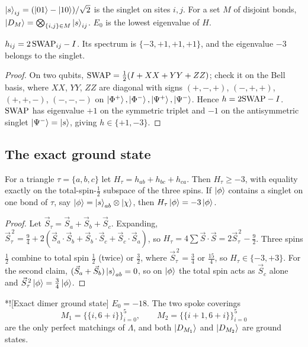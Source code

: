 \begin{ntn}
  $\ket{s}_{ij}=(\ket{01}-\ket{10})/\sqrt2$ is the singlet on sites $i,j$. For a set $M$ of
  disjoint bonds, $\ket{D_M}=\bigotimes_{\{i,j\}\in M}\ket{s}_{ij}$. $E_0$ is the lowest
  eigenvalue of $H$.
\end{ntn}

\begin{lem}\label{lem:bond}
  $h_{ij}=2\,\mathrm{SWAP}_{ij}-I$. Its spectrum is $\{-3,+1,+1,+1\}$, and the eigenvalue $-3$
  belongs to the singlet.
\end{lem}

\begin{proof}
  On two qubits, $\mathrm{SWAP}=\tfrac12(I+XX+YY+ZZ)$; check it on the Bell basis, where $XX$, $YY$, $ZZ$
  are diagonal with signs $(+,-,+)$, $(-,+,+)$, $(+,+,-)$, $(-,-,-)$ on
  $\ket{\Phi^+},\ket{\Phi^-},\ket{\Psi^+},\ket{\Psi^-}$. Hence $h=2\mathrm{SWAP}-I$. $\mathrm{SWAP}$ has
  eigenvalue $+1$ on the symmetric triplet and $-1$ on the antisymmetric singlet
  $\ket{\Psi^-}=\ket s$, giving $h\in\{+1,-3\}$.
\end{proof}

\subsection{The exact ground state}

\begin{lem}\label{lem:triangle}
  For a triangle $\tau=\{a,b,c\}$ let $H_\tau=h_{ab}+h_{bc}+h_{ca}$. Then $H_\tau\geq-3$, with
  equality exactly on the total-spin-$\tfrac12$ subspace of the three spins. If $\ket\phi$
  contains a singlet on one bond of $\tau$, say $\ket\phi=\ket s_{ab}\otimes\ket{\chi}$, then
  $H_\tau\ket\phi=-3\ket\phi$.
\end{lem}

\begin{proof}
  Let $\vec S_\tau=\vec S_a+\vec S_b+\vec S_c$. Expanding,
  $\vec S_\tau^{\,2}=\tfrac94+2(\vec S_a\cdot\vec S_b+\vec S_b\cdot\vec S_c+\vec S_c\cdot\vec S_a)$,
  so $H_\tau=4\sum\vec S\cdot\vec S=2\vec S_\tau^{\,2}-\tfrac92$. Three spins $\tfrac12$
  combine to total spin $\tfrac12$ (twice) or $\tfrac32$, where $\vec S_\tau^{\,2}=\tfrac34$ or
  $\tfrac{15}4$, so $H_\tau\in\{-3,+3\}$. For the second claim, $(\vec S_a+\vec S_b)\ket s_{ab}=0$,
  so on $\ket\phi$ the total spin acts as $\vec S_c$ alone and
  $\vec S_\tau^{\,2}\ket\phi=\tfrac34\ket\phi$.
\end{proof}

\begin{thm}*![Exact dimer ground state]\label{thm:ground}
  $E_0=-18$. The two spoke coverings
  \[
    M_1=\bigl\{\{i,6+i\}\bigr\}_{i=0}^5,\qquad M_2=\bigl\{\{i+1,6+i\}\bigr\}_{i=0}^5
  \]
  are the only perfect matchings of $\Lambda$, and both $\ket{D_{M_1}}$ and $\ket{D_{M_2}}$ are
  ground states.
\end{thm}

